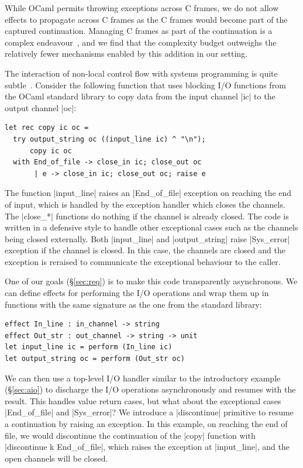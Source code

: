 \documentclass[sigplan,10pt,review,anonymous]{acmart}\settopmatter{printfolios=true,printccs=false,printacmref=false}
\begin{document}
While OCaml permits throwing exceptions across C frames, we do not allow
effects to propagate across C frames as the C frames would become part of the
captured continuation. Managing C frames as part of the continuation is a
complex endeavour~\cite{Leijen17}, and we find that the complexity budget
outweighs the relatively fewer mechanisms enabled by this addition in our
setting.

The interaction of non-local control flow with systems programming is quite
subtle~\cite{TFP17}. Consider the following function that uses blocking I/O
functions from the OCaml standard library to copy data from the input channel
|ic| to the output channel |oc|:
\begin{lstlisting}
let rec copy ic oc =
  try output_string oc ((input_line ic) ^ "\n");
      copy ic oc
  with End_of_file -> close_in ic; close_out oc
	   | e -> close_in ic; close_out oc; raise e
\end{lstlisting}
The function |input_line| raises an |End_of_file| exception on reaching the end of
input, which is handled by the exception handler which closes the channels. The
|close_*| functions do nothing if the channel is already closed. The code is
written in a defensive style to handle other exceptional cases such as the
channels being closed externally. Both |input_line| and |output_string| raise
|Sys_error| exception if the channel is closed. In this case, the channels are
closed and the exception is reraised to communicate the exceptional behaviour
to the caller.

One of our goals (\S\ref{sec:req}) is to make this code transparently
asynchronous. We can define effects for performing the I/O operations and wrap
them up in functions with the same signature as the one from the standard
library:
\begin{lstlisting}
effect In_line : in_channel -> string
effect Out_str : out_channel -> string -> unit
let input_line ic = perform (In_line ic)
let output_string oc = perform (Out_str oc)
\end{lstlisting}

We can then use a top-level I/O handler similar to the introductory example
(\S\ref{sec:aio}) to discharge the I/O operations asynchronously and resumes
with the result. This handles value return cases, but what about the
exceptional cases |End_of_file| and |Sys_error|? We introduce a |discontinue|
primitive to resume a continuation by raising an exception. In this example, on
reaching the end of file, we would discontinue the continuation of the |copy|
function with |discontinue k End_of_file|, which raises the exception at
|input_line|, and the open channels will be closed.
\end{document}
